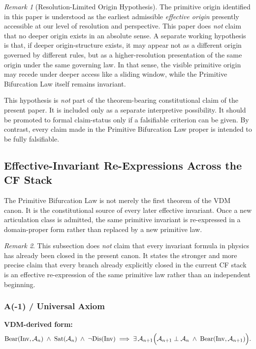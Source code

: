 \documentclass[11pt]{article}
\theoremstyle{definition}
\theoremstyle{plain}
\theoremstyle{remark}
\newtheorem{remark}{Remark}
\newcommand{\Inv}{\mathrm{Inv}}
\newcommand{\Sat}{\mathrm{Sat}}
\newcommand{\Bear}{\mathrm{Bear}}
\newcommand{\Dis}{\mathrm{Dis}}
\newcommand{\Aclass}{\mathcal{A}}
\begin{document}
\begin{remark}[Resolution-Limited Origin Hypothesis]
The primitive origin identified in this paper is understood as the earliest admissible \emph{effective origin} presently accessible at our level of resolution and perspective. This paper does \emph{not} claim that no deeper origin exists in an absolute sense. A separate working hypothesis is that, if deeper origin-structure exists, it may appear not as a different origin governed by different rules, but as a higher-resolution presentation of the same origin under the same governing law. In that sense, the visible primitive origin may recede under deeper access like a sliding window, while the Primitive Bifurcation Law itself remains invariant.

This hypothesis is \emph{not} part of the theorem-bearing constitutional claim of the present paper. It is included only as a separate interpretive possibility. It should be promoted to formal claim-status only if a falsifiable criterion can be given. By contrast, every claim made in the Primitive Bifurcation Law proper is intended to be fully falsifiable.
\end{remark}


\subsection*{Effective-Invariant Re-Expressions Across the CF Stack}

The Primitive Bifurcation Law is not merely the first theorem of the VDM canon.
It is the constitutional source of every later effective invariant. Once a new
articulation class is admitted, the same primitive invariant is re-expressed in
a domain-proper form rather than replaced by a new primitive law.

\begin{remark}
This subsection does \emph{not} claim that every invariant formula in physics
has already been closed in the present canon. It states the stronger and more
precise claim that every branch already explicitly closed in the current CF
stack is an effective re-expression of the same primitive law rather than an
independent beginning.
\end{remark}

\subsubsection*{A(-1) / Universal Axiom}
\textbf{VDM-derived form:}
\[
\Bear(\Inv,\Aclass_n)
\;\wedge\;
\Sat(\Aclass_n)
\;\wedge\;
\neg\Dis(\Inv)
\;\Longrightarrow\;
\exists\,\Aclass_{n+1}
\Bigl(
\Aclass_{n+1}\perp\Aclass_n
\;\wedge\;
\Bear(\Inv,\Aclass_{n+1})
\Bigr).
\]
\end{document}
